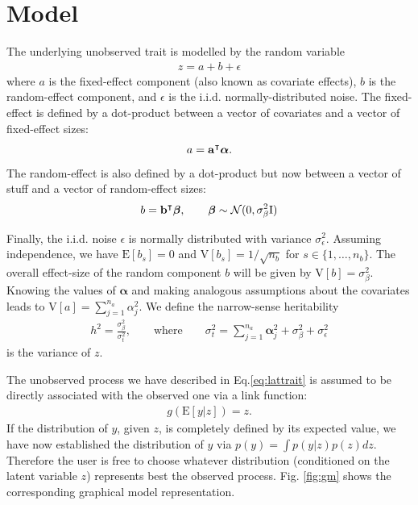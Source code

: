\section{Model}

The underlying unobserved trait is modelled by the random variable
\begin{align}\label{eq:lattrait}
  z = a + b + \epsilon
\end{align} where $a$ is the fixed-effect
component (also known as covariate effects), $b$ is the random-effect component,
and $\epsilon$ is the i.i.d. normally-distributed noise.
The fixed-effect is defined by a dot-product between a vector of covariates and
a vector of fixed-effect sizes:
\begin{align*}
  a = \mathbf a^\intercal \boldsymbol\alpha.
\end{align*}
The random-effect is also defined by a dot-product but now between
a vector of stuff and a vector of random-effect sizes:
\begin{align*}
  b = \mathbf b^\intercal \boldsymbol\beta, \qquad \boldsymbol\beta \sim \mathcal N(0, \sigma^2_{\beta} \mathrm I)
\end{align*}

Finally, the i.i.d. noise $\epsilon$ is normally distributed with variance
$\sigma^2_{\epsilon}$.
Assuming independence, we have $\mathrm E[b_s] = 0$ and
$\mathrm V[b_s]=1/\sqrt{n_b}$ for $s \in \{1, \dots, n_b\}$.
The overall effect-size of the random component $b$ will be given by
$\mathrm V[b] = \sigma^2_{\beta}$.
Knowing the values of $\boldsymbol\alpha$ and making analogous
assumptions about the covariates leads to $\mathrm V[a]  =
\sum_{j=1}^{n_a} \alpha_j^2$.
We define the narrow-sense heritability
\begin{align*}
  h^2=\frac{\sigma^2_{\beta}}{\sigma_t^2}, \qquad \text{where} \qquad \sigma_t^2 =
  \sum_{j=1}^{n_a} \boldsymbol \alpha_j^2 + \sigma^2_{\beta} +
  \sigma^2_{\epsilon}
\end{align*}
is the variance of $z$.

The unobserved process we have described in Eq.\eqref{eq:lattrait} is assumed
to be directly associated with the observed one via a link function:
\begin{align*}
  g(\mathrm E[y|z]) = z.
\end{align*}
If the distribution of $y$, given $z$, is completely defined by its
expected value, we have now established the distribution of $y$ via
$p(y) = \int p(y|z)p(z)dz$.
Therefore the user is free to choose whatever distribution (conditioned on the
latent variable $z$) represents best the observed process.
Fig. \ref{fig:gm} shows the corresponding graphical model representation.


